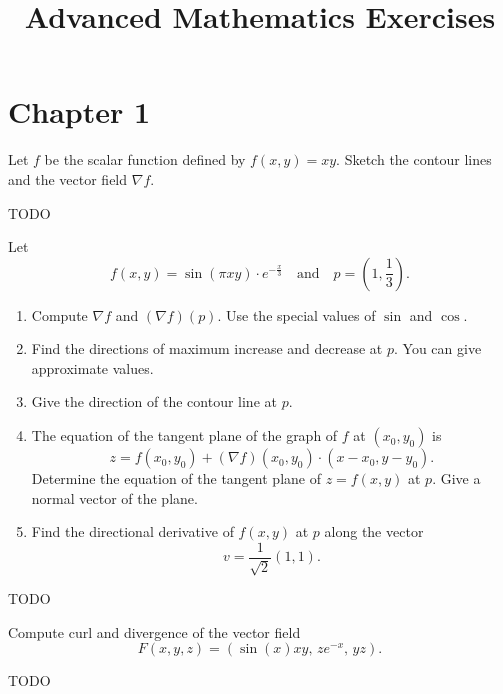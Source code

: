 \documentclass[11pt]{article}
\title{Advanced Mathematics Exercises}
\date{}
\begin{document}
\maketitle

\section{Chapter 1}

\begin{exercise}
	Let $f$ be the scalar function defined by $f(x,y) = xy$. Sketch the contour lines and the vector field $\nabla f$.
\end{exercise}

\begin{solution}
	TODO
\end{solution}

\begin{exercise}
	Let
	$$
		f(x,y) = \sin(\pi xy) \cdot e^{-\frac{x}{3}} \quad \text{and} \quad p = \left(1, \frac{1}{3}\right).
	$$
	\begin{enumerate}
		\item Compute $\nabla f$ and $(\nabla f)(p)$. Use the special values of $\sin$ and $\cos$.
		\item Find the directions of maximum increase and decrease at $p$. You can give approximate values.
		\item Give the direction of the contour line at $p$.
		\item The equation of the tangent plane of the graph of $f$ at $(x_0, y_0)$ is
		      $$
			      z = f(x_0, y_0) + (\nabla f)(x_0, y_0) \cdot (x - x_0, y - y_0).
		      $$
		      Determine the equation of the tangent plane of $z = f(x,y)$ at $p$. Give a normal vector of the plane.
		\item Find the directional derivative of $f(x,y)$ at $p$ along the vector
		      $$
			      v = \frac{1}{\sqrt{2}} (1,1).
		      $$
	\end{enumerate}
\end{exercise}

\begin{solution}
	TODO
\end{solution}

\begin{exercise}
	Compute curl and divergence of the vector field
	$$
		F(x,y,z) = (\sin(x)xy, \, ze^{-x}, \, yz).
	$$
\end{exercise}

\begin{solution}
	TODO
\end{solution}
\end{document}
